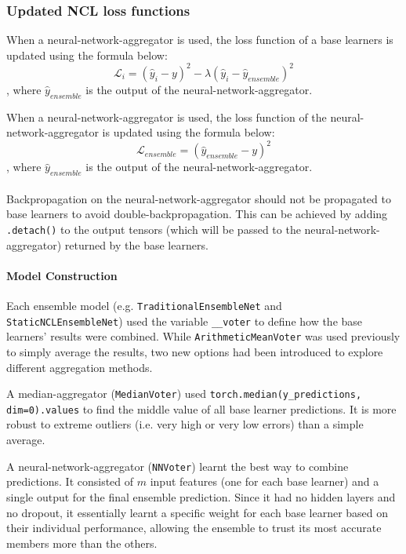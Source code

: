 \subsubsection{Updated NCL loss functions}
When a neural-network-aggregator is used, the loss function of a base learners is updated using the formula below: 
\begin{equation}
    \label{equation:recursive_nn_loss_function_base_learner}
    \mathcal{L}_i = (\hat{y}_i - y)^2 - \lambda (\hat{y}_i - \hat{y}_{ensemble})^2
\end{equation}
, where $\hat{y}_{ensemble}$ is the output of the neural-network-aggregator. 

When a neural-network-aggregator is used, the loss function of the neural-network-aggregator is updated using the formula below: 
\begin{equation}
    \label{equation:recursive_nn_loss_function_aggregator}
    \mathcal{L}_{ensemble} = (\hat{y}_{ensemble} - y)^2
\end{equation}
, where $\hat{y}_{ensemble}$ is the output of the neural-network-aggregator. 
\\
\\
Backpropagation on the neural-network-aggregator should not be propagated to base learners to avoid double-backpropagation. This can be achieved by adding \texttt{.detach()} to the output tensors (which will be passed to the neural-network-aggregator) returned by the base learners. 


\paragraph{Model Construction}
Each ensemble model (e.g. \texttt{TraditionalEnsembleNet} and \texttt{StaticNCLEnsembleNet}) used the variable \texttt{\_\_voter} to define how the base learners' results were combined. While \texttt{ArithmeticMeanVoter} was used previously to simply average the results, two new options had been introduced to explore different aggregation methods. 

A median-aggregator (\texttt{MedianVoter}) used \texttt{torch.median(y\_predictions, dim=0).values} to find the middle value of all base learner predictions. It is more robust to extreme outliers (i.e. very high or very low errors) than a simple average. 

A neural-network-aggregator (\texttt{NNVoter}) learnt the best way to combine predictions. It consisted of $m$ input features (one for each base learner) and a single output for the final ensemble prediction. Since it had no hidden layers and no dropout, it essentially learnt a specific weight for each base learner based on their individual performance, allowing the ensemble to trust its most accurate members more than the others. 


